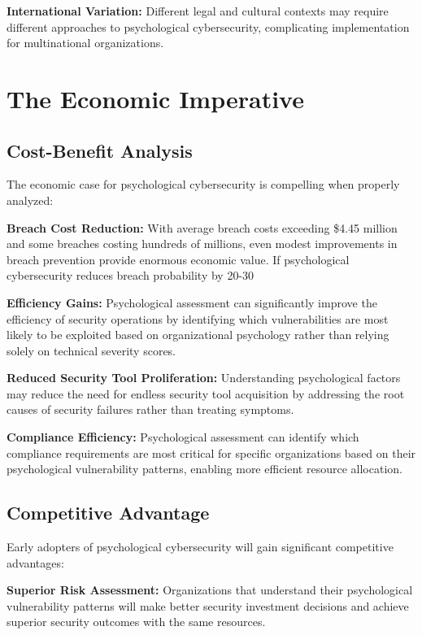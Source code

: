 \documentclass[10pt, twocolumn]{article}
\begin{document}
\textbf{International Variation:} Different legal and cultural contexts may require different approaches to psychological cybersecurity, complicating implementation for multinational organizations.

\section{The Economic Imperative}

\subsection{Cost-Benefit Analysis}

The economic case for psychological cybersecurity is compelling when properly analyzed:

\textbf{Breach Cost Reduction:} With average breach costs exceeding \$4.45 million and some breaches costing hundreds of millions, even modest improvements in breach prevention provide enormous economic value. If psychological cybersecurity reduces breach probability by 20-30%

\textbf{Efficiency Gains:} Psychological assessment can significantly improve the efficiency of security operations by identifying which vulnerabilities are most likely to be exploited based on organizational psychology rather than relying solely on technical severity scores.

\textbf{Reduced Security Tool Proliferation:} Understanding psychological factors may reduce the need for endless security tool acquisition by addressing the root causes of security failures rather than treating symptoms.

\textbf{Compliance Efficiency:} Psychological assessment can identify which compliance requirements are most critical for specific organizations based on their psychological vulnerability patterns, enabling more efficient resource allocation.

\subsection{Competitive Advantage}

Early adopters of psychological cybersecurity will gain significant competitive advantages:

\textbf{Superior Risk Assessment:} Organizations that understand their psychological vulnerability patterns will make better security investment decisions and achieve superior security outcomes with the same resources.
\end{document}

